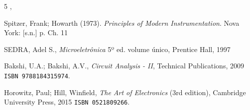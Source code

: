 \documentclass[letterpaper, 12pt]{article}
\begin{document}
5  ,


\begin{thebibliography}{100}

Spitzer, Frank; Howarth (1973). \textit{Principles of Modern Instrumentation}. Nova York: [s.n.] p. Ch. 11

SEDRA, Adel S., \textit{Microeletrônica} 5º ed. volume único, Prentice Hall, 1997

Bakshi, U.A.; Bakshi, A.V., \textit{Circuit Analysis - II}, Technical Publications, 2009 \texttt{ISBN 9788184315974}.

Horowitz, Paul; Hill, Winfield, \textit{The Art of Electronics} (3rd edition), Cambridge University Press, 2015 \texttt{ISBN 0521809266}.

\end{thebibliography}
\end{document}
